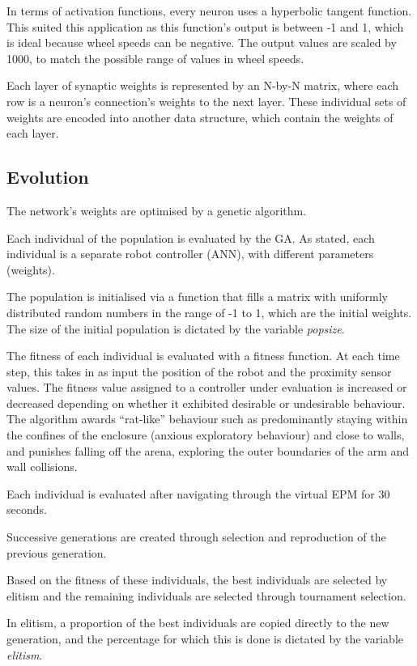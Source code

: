 In terms of activation functions, every neuron uses a hyperbolic tangent function. This suited this application as this function’s output is between -1 and 1, which is ideal because wheel speeds can be negative. The output values are scaled by 1000, to match the possible range of values in wheel speeds.

Each layer of synaptic weights is represented by an N-by-N matrix, where each row is a neuron's connection's weights to the next layer. \cite{Seiffert2001} These individual sets of weights are encoded into another data structure, which contain the weights of each layer. 

\subsection{Evolution}

The network's weights are optimised by a genetic algorithm. 

Each individual of the population is evaluated by the GA. As stated, each individual is a separate robot controller (ANN), with different parameters (weights).

The population is initialised via a function that fills a matrix with uniformly distributed random numbers in the range of -1 to 1, which are the initial weights. The size of the initial population is dictated by the variable \emph{popsize}. 

The fitness of each individual is evaluated with a fitness function. At each time step, this takes in as input the position of the robot and the proximity sensor values. The fitness value assigned to a controller under evaluation is increased or decreased depending on whether it exhibited desirable or undesirable behaviour. The algorithm awards ``rat-like'' behaviour such as predominantly staying within the confines of the enclosure (anxious exploratory behaviour) and close to walls, and punishes falling off the arena, exploring the outer boundaries of the arm and wall collisions.

Each individual is evaluated after navigating through the virtual EPM for 30 seconds.

Successive generations are created through selection and reproduction of the previous generation.

Based on the fitness of these individuals, the best individuals are selected by elitism and the remaining individuals are selected through tournament selection. 

In elitism, a proportion of the best individuals are copied directly to the new generation, and the percentage for which this is done is dictated by the variable \textit{elitism}. 

